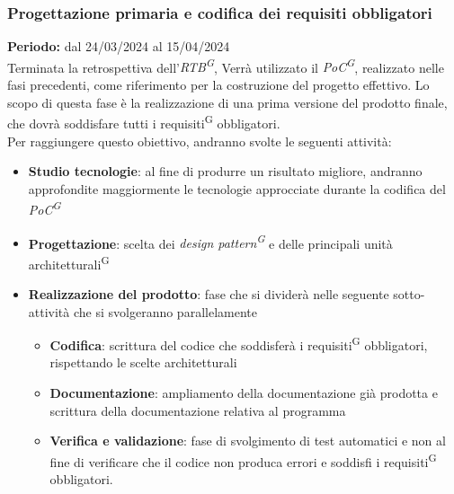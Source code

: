 \documentclass[5pt]{article}
\begin{document}
    \subsubsection{Progettazione primaria e codifica dei requisiti obbligatori}
      \textbf{Periodo:} dal 24/03/2024 al 15/04/2024 
      \vspace{0.3cm} \\
      Terminata la retrospettiva dell'\textit{RTB\textsuperscript{G}}, Verrà utilizzato il \textit{PoC\textsuperscript{G}}, realizzato nelle fasi precedenti, 
      come riferimento per la costruzione del progetto effettivo.
      Lo scopo di questa fase è la realizzazione di una prima versione del prodotto finale, che dovrà soddisfare tutti i requisiti\textsuperscript{G} obbligatori. \\
      Per raggiungere questo obiettivo, andranno svolte le seguenti attività:
      \begin{itemize}
        \item \textbf{Studio tecnologie}: al fine di produrre un risultato migliore, andranno approfondite maggiormente le tecnologie approcciate 
        durante la codifica del \textit{PoC\textsuperscript{G}}
        \item \textbf{Progettazione}: scelta dei \textit{design pattern\textsuperscript{G}} e delle principali unità architetturali\textsuperscript{G}
        \item \textbf{Realizzazione del prodotto}: fase che si dividerà nelle seguente sotto-attività che si svolgeranno parallelamente
        \begin{itemize}
          \item \textbf{Codifica}: scrittura del codice che soddisferà i requisiti\textsuperscript{G} obbligatori, rispettando le scelte architetturali
          \item \textbf{Documentazione}: ampliamento della documentazione già prodotta e scrittura della documentazione relativa al programma
          \item \textbf{Verifica e validazione}: fase di svolgimento di test automatici e non al fine di verificare che il codice non produca errori e soddisfi i requisiti\textsuperscript{G} obbligatori.
        \end{itemize}  
      \end{itemize}
    
\end{document}
